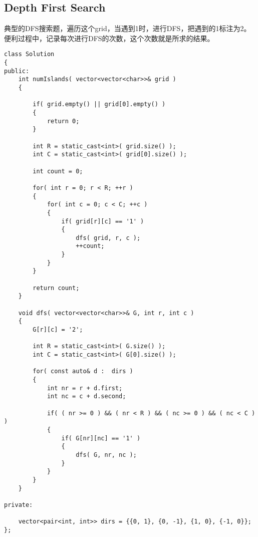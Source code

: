 \subsection{Depth First Search}
\begin{CJK*}{UTF8}{gbsn}
典型的DFS搜索题，遍历这个grid，当遇到1时，进行DFS，把遇到的1标注为2。便利过程中，记录每次进行DFS的次数，这个次数就是所求的结果。
\end{CJK*}
\setcounter{lstlisting}{0}
\begin{lstlisting}[style=customc, caption={DFS}]
class Solution
{
public:
    int numIslands( vector<vector<char>>& grid )
    {

        if( grid.empty() || grid[0].empty() )
        {
            return 0;
        }

        int R = static_cast<int>( grid.size() );
        int C = static_cast<int>( grid[0].size() );

        int count = 0;

        for( int r = 0; r < R; ++r )
        {
            for( int c = 0; c < C; ++c )
            {
                if( grid[r][c] == '1' )
                {
                    dfs( grid, r, c );
                    ++count;
                }
            }
        }

        return count;
    }

    void dfs( vector<vector<char>>& G, int r, int c )
    {
        G[r][c] = '2';

        int R = static_cast<int>( G.size() );
        int C = static_cast<int>( G[0].size() );

        for( const auto& d :  dirs )
        {
            int nr = r + d.first;
            int nc = c + d.second;

            if( ( nr >= 0 ) && ( nr < R ) && ( nc >= 0 ) && ( nc < C ) )
            {
                if( G[nr][nc] == '1' )
                {
                    dfs( G, nr, nc );
                }
            }
        }
    }

private:

    vector<pair<int, int>> dirs = {{0, 1}, {0, -1}, {1, 0}, {-1, 0}};
};
\end{lstlisting}